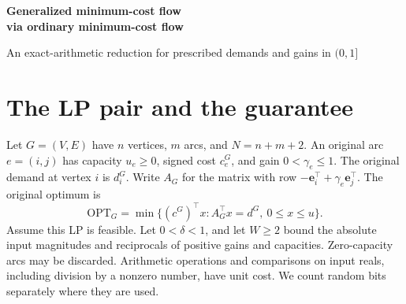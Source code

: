 \documentclass[11pt,letterpaper]{article}
\begin{document}
\begin{center}
{\LARGE\bfseries Generalized minimum-cost flow\\[3pt]via ordinary minimum-cost flow}\par
\vspace{3pt}
{\large An exact-arithmetic reduction for prescribed demands and gains in $(0,1]$}
\end{center}

\begin{abstract}\noindent
We solve the box-constrained price LP $\max\{d^\top y:Ay\le c,\ |y_i|\le R\}$
for the inward-pointing capacity gadget. A price update reduces to minimizing
homogeneous positive parts on boxes. Each local model is dual to an ordinary
unit-gain min-cost flow problem. To recover the primal, a second, randomly
perturbed price optimization identifies a linearly independent set of rows.
Tree and cycle substitutions give the primal amounts, and signed unit variables
restore the prescribed demands exactly in the grounded LP. For inverse-polynomial
additive accuracy in a range parameter $P$, the reduction uses
$O(\log^4 P)$ ordinary min-cost flow models on linear-size graphs.
\end{abstract}
\tableofcontents

\section{The LP pair and the guarantee}\label{sec:pair}
Let $G=(V,E)$ have $n$ vertices, $m$ arcs, and $N=n+m+2$. An original
arc $e=(i,j)$ has capacity $u_e\ge0$, signed cost $c^G_e$, and gain
$0<\gamma_e\le1$. The original demand at vertex $i$ is $d^G_i$.
Write $A_G$ for the matrix with row $-\mathbf e_i^\top+\gamma_e\mathbf e_j^\top$.
The original optimum is
\[
 \mathrm{OPT}_G=\min\{(c^G)^\top x: A_G^\top x=d^G,\ 0\le x\le u\}.
\]
Assume this LP is feasible. Let $0<\delta<1$, and let $W\ge2$ bound the
absolute input magnitudes and reciprocals of positive gains and capacities.
Zero-capacity arcs may be discarded. Arithmetic operations and comparisons
on input reals, including division by a nonzero number, have unit cost.
We count random bits separately where they are used.
\end{document}
